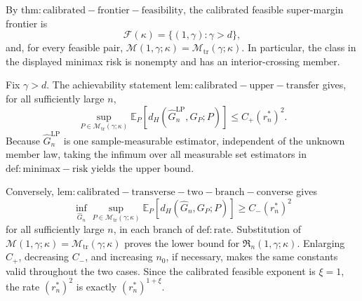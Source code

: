 By \(\mathrm{thm:calibrated-frontier-feasibility}\), the calibrated feasible super-margin frontier is
\[
 \mathcal F(\kappa)=\{(1,\gamma):\gamma>d\},
\]
and, for every feasible pair, \(\mathcal M(1,\gamma;\kappa)=\mathcal M_{\mathrm{tr}}(\gamma;\kappa)\). In particular, the class in the displayed minimax risk is nonempty and has an interior-crossing member.

Fix \(\gamma>d\). The achievability statement \(\mathrm{lem:calibrated-upper-transfer}\) gives, for all sufficiently large \(n\),
\[
 \sup_{P\in\mathcal M_{\mathrm{tr}}(\gamma;\kappa)}
 \mathbb E_P\!\left[d_H(\widehat G_n^{\mathrm{LP}},G_P;P)\right]
 \le C_+(r_n^*)^2.
\]
Because \(\widehat G_n^{\mathrm{LP}}\) is one sample-measurable estimator, independent of the unknown member law, taking the infimum over all measurable set estimators in \(\mathrm{def:minimax-risk}\) yields the upper bound.

Conversely, \(\mathrm{lem:calibrated-transverse-two-branch-converse}\) gives
\[
 \inf_{\widehat G_n}\sup_{P\in\mathcal M_{\mathrm{tr}}(\gamma;\kappa)}
 \mathbb E_P\!\left[d_H(\widehat G_n,G_P;P)\right]
 \ge C_-(r_n^*)^2
\]
for all sufficiently large \(n\), in each branch of \(\mathrm{def:rate}\). Substitution of \(\mathcal M(1,\gamma;\kappa)=\mathcal M_{\mathrm{tr}}(\gamma;\kappa)\) proves the lower bound for \(\mathfrak R_n(1,\gamma;\kappa)\). Enlarging \(C_+\), decreasing \(C_-\), and increasing \(n_0\), if necessary, makes the same constants valid throughout the two cases. Since the calibrated feasible exponent is \(\xi=1\), the rate \((r_n^*)^2\) is exactly \((r_n^*)^{1+\xi}\).